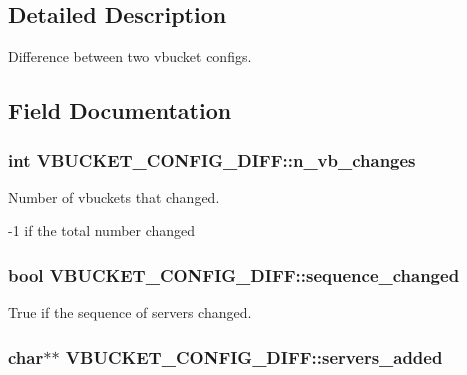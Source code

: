 \subsection{Detailed Description}
Difference between two vbucket configs. 

\subsection{Field Documentation}
\hypertarget{struct_v_b_u_c_k_e_t___c_o_n_f_i_g___d_i_f_f_a59f7ed3bc75f0b50128c0f397f3140a4}{
\subsubsection[{n\_\-vb\_\-changes}]{\setlength{\rightskip}{0pt plus 5cm}int {\bf VBUCKET\_\-CONFIG\_\-DIFF::n\_\-vb\_\-changes}}}
\label{struct_v_b_u_c_k_e_t___c_o_n_f_i_g___d_i_f_f_a59f7ed3bc75f0b50128c0f397f3140a4}


Number of vbuckets that changed. 

-\/1 if the total number changed \hypertarget{struct_v_b_u_c_k_e_t___c_o_n_f_i_g___d_i_f_f_a4b14e6d33d9c4d0c20e6b8dcea3e8cd6}{
\subsubsection[{sequence\_\-changed}]{\setlength{\rightskip}{0pt plus 5cm}bool {\bf VBUCKET\_\-CONFIG\_\-DIFF::sequence\_\-changed}}}
\label{struct_v_b_u_c_k_e_t___c_o_n_f_i_g___d_i_f_f_a4b14e6d33d9c4d0c20e6b8dcea3e8cd6}


True if the sequence of servers changed. 

\hypertarget{struct_v_b_u_c_k_e_t___c_o_n_f_i_g___d_i_f_f_a9dfbe7534e62b0938d11696f3ae8d970}{
\subsubsection[{servers\_\-added}]{\setlength{\rightskip}{0pt plus 5cm}char$\ast$$\ast$ {\bf VBUCKET\_\-CONFIG\_\-DIFF::servers\_\-added}}}
\label{struct_v_b_u_c_k_e_t___c_o_n_f_i_g___d_i_f_f_a9dfbe7534e62b0938d11696f3ae8d970}


